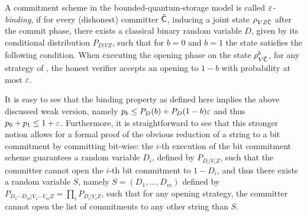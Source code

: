 \begin{definition}\label{def:strongbinding}
  A commitment scheme in the bounded-quantum-storage model is called
  {\em $\varepsilon$-binding}, if for every (dishonest) committer $\tilde{\sf
    C}$, inducing a joint state $\rho_{V Z \tilde{\sf C}}$ after the
  commit phase, there exists a classical binary random variable $D$,
  given by its conditional distribution $P_{D|VZ}$, such that for
  $b=0$ and $b=1$ the state  satisfies the following condition.
  When executing the opening phase on the state $\rho_{V \tilde{\sf
      C}}^{b}$, for any strategy of , the
  honest verifier accepts an opening to $1-b$ with probability at most
  $\varepsilon$.
\end{definition}
It is easy to see that the binding property as defined here implies
the above discussed weak version, namely $p_b \leq P_{D}(b) +
P_{D}(1-b)\varepsilon$ and thus $p_0 + p_1 \leq 1 + \varepsilon$.  Furthermore, it
is straightforward to see that this stronger notion allows for a
formal proof of the obvious reduction of a string to a bit commitment
by committing bit-wise: the $i$-th execution of the bit commitment
scheme guarantees a random variable $D_i$, defined by $P_{D_i|V_i
  Z}$, such that the committer cannot open the $i$-th bit commitment
to $1-D_i$, and thus there exists a random variable $S$, namely $S
= (D_1,\ldots,D_m)$ defined by $P_{D_1\cdots D_m|V_1\cdots V_m Z}
= \prod_i P_{D_i|V_i Z}$, such that for any opening strategy, the
committer cannot open the list of commitments to any other string than
$S$.



